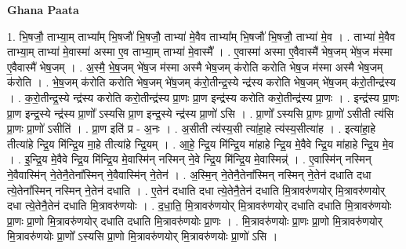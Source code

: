 \documentclass[17pt]{extarticle}
\begin{document}
\textbf{Ghana Paata } \newline

1. भि॒षजौ॒ ताभ्या॒म् ताभ्या᳚म् भि॒षजौ॑ भि॒षजौ॒ ताभ्या॑ मे॒वैव ताभ्या᳚म् भि॒षजौ॑ भि॒षजौ॒ ताभ्या॑ मे॒व । . ताभ्या॑ मे॒वैव ताभ्या॒म् ताभ्या॑ मे॒वास्मा॑ अस्मा ए॒व ताभ्या॒म् ताभ्या॑ मे॒वास्मै᳚ । . ए॒वास्मा॑ अस्मा ए॒वैवास्मै॑ भेष॒जम् भे॑ष॒ज म॑स्मा ए॒वैवास्मै॑ भेष॒जम् । . अ॒स्मै॒ भे॒ष॒जम् भे॑ष॒ज म॑स्मा अस्मै भेष॒जम् क॑रोति करोति भेष॒ज म॑स्मा अस्मै भेष॒जम् क॑रोति । . भे॒ष॒जम् क॑रोति करोति भेष॒जम् भे॑ष॒जम् क॑रो॒तीन्द्र॒स्ये न्द्र॑स्य करोति भेष॒जम् भे॑ष॒जम् क॑रो॒तीन्द्र॑स्य । . क॒रो॒तीन्द्र॒स्ये न्द्र॑स्य करोति करो॒तीन्द्र॑स्य प्रा॒णः प्रा॒ण इन्द्र॑स्य करोति करो॒तीन्द्र॑स्य प्रा॒णः । . इन्द्र॑स्य प्रा॒णः प्रा॒ण इन्द्र॒स्ये न्द्र॑स्य प्रा॒णो᳚ ऽस्यसि प्रा॒ण इन्द्र॒स्ये न्द्र॑स्य प्रा॒णो॑ ऽसि । . प्रा॒णो᳚ ऽस्यसि प्रा॒णः प्रा॒णो॑ ऽसीती त्य॑सि प्रा॒णः प्रा॒णो॑ ऽसीति॑ । . प्रा॒ण इति॑ प्र - अ॒नः । . अ॒सीती त्य॑स्य॒सी त्या॑हा॒हे त्य॑स्य॒सीत्या॑ह । . इत्या॑हा॒हे तीत्या॑हे न्द्रि॒य मि॑न्द्रि॒य मा॒हे तीत्या॑हे न्द्रि॒यम् । . आ॒हे॒ न्द्रि॒य मि॑न्द्रि॒य मा॑हाहे न्द्रि॒य मे॒वैवे न्द्रि॒य मा॑हाहे न्द्रि॒य मे॒व । . इ॒न्द्रि॒य मे॒वैवे न्द्रि॒य मि॑न्द्रि॒य मे॒वास्मि॑न् नस्मिन् ने॒वे न्द्रि॒य मि॑न्द्रि॒य मे॒वास्मिन्न्॑ । . ए॒वास्मि॑न् नस्मिन् ने॒वैवास्मि॑न् ने॒तेनै॒तेना᳚स्मिन् ने॒वैवास्मि॑न् ने॒तेन॑ । . अ॒स्मि॒न् ने॒तेनै॒तेना᳚स्मिन् नस्मिन् ने॒तेन॑ दधाति दधा त्ये॒तेना᳚स्मिन् नस्मिन् ने॒तेन॑ दधाति । . ए॒तेन॑ दधाति दधा त्ये॒तेनै॒तेन॑ दधाति मि॒त्रावरु॑णयोर् मि॒त्रावरु॑णयोर् दधा त्ये॒तेनै॒तेन॑ दधाति मि॒त्रावरु॑णयोः । . द॒धा॒ति॒ मि॒त्रावरु॑णयोर् मि॒त्रावरु॑णयोर् दधाति दधाति मि॒त्रावरु॑णयोः प्रा॒णः प्रा॒णो मि॒त्रावरु॑णयोर् दधाति दधाति मि॒त्रावरु॑णयोः प्रा॒णः । . मि॒त्रावरु॑णयोः प्रा॒णः प्रा॒णो मि॒त्रावरु॑णयोर् मि॒त्रावरु॑णयोः प्रा॒णो᳚ ऽस्यसि प्रा॒णो मि॒त्रावरु॑णयोर् मि॒त्रावरु॑णयोः प्रा॒णो॑ ऽसि । \newline
\end{document}
